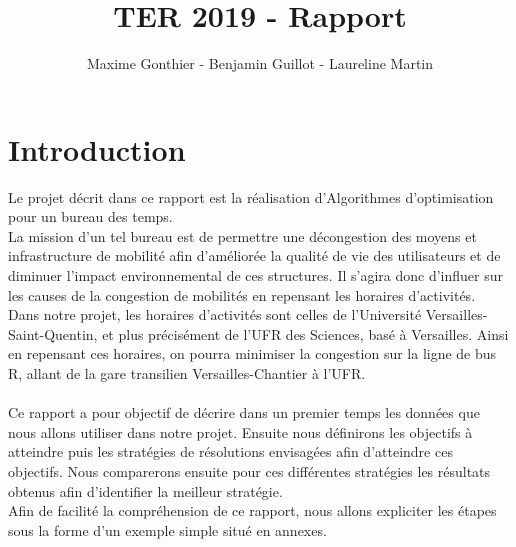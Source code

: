 \documentclass[a4paper,11pt]{article}
\title{TER 2019 - Rapport}
\author{Maxime Gonthier - Benjamin Guillot - Laureline Martin}
\begin{document}
\clearpage
\maketitle

\newpage
\tableofcontents

\newpage
\section{Introduction}
	Le projet décrit dans ce rapport est la réalisation d'Algorithmes d'optimisation pour un bureau des temps.\\
	La mission d'un tel bureau est de permettre une décongestion des moyens et infrastructure de mobilité afin d'améliorée la qualité de vie des utilisateurs et de diminuer l'impact environnemental de ces structures. Il s'agira donc d'influer sur les causes de la congestion de mobilités en repensant les horaires d'activités.\\
	Dans notre projet, les horaires d'activités sont celles de l'Université Versailles-Saint-Quentin, et plus précisément de l'UFR des Sciences, basé à Versailles. Ainsi en repensant ces horaires, on pourra minimiser la congestion sur la ligne de bus R, allant de la gare transilien Versailles-Chantier à l'UFR.\\
	\\
	Ce rapport a pour objectif de décrire dans un premier temps les données que nous allons utiliser dans notre projet. Ensuite nous définirons les objectifs à atteindre  puis les stratégies de résolutions envisagées afin d'atteindre ces objectifs.
	Nous comparerons ensuite pour ces différentes stratégies les résultats obtenus afin d'identifier la meilleur stratégie.\\
	Afin de facilité la compréhension de ce rapport, nous allons expliciter les étapes sous la forme d'un exemple simple situé en annexes.
	
	
\end{document}
